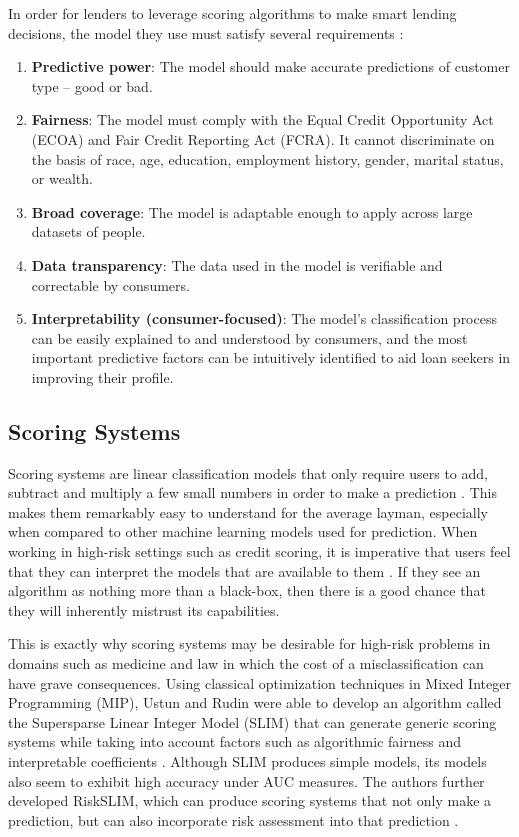 \documentclass[11pt, margin=1in]{article}
\begin{document}
In order for lenders to leverage scoring algorithms to make smart lending decisions, the model they use must satisfy several requirements \cite{fico-criteria}:
\begin{enumerate}
	\item \textbf{Predictive power}: The model should make accurate predictions of customer type -- good or bad.
	\item \textbf{Fairness}: The model must comply with the Equal Credit Opportunity Act (ECOA) and Fair Credit Reporting Act (FCRA). It cannot discriminate on the basis of race, age, education, employment history, gender, marital status, or wealth.
	\item \textbf{Broad coverage}: The model is adaptable enough to apply across large datasets of people.
	\item \textbf{Data transparency}: The data used in the model is verifiable and correctable by consumers.
	\item \textbf{Interpretability (consumer-focused)}: The model's classification process can be easily explained to and understood by consumers, and the most important predictive factors can be intuitively identified to aid loan seekers in improving their profile.
\end{enumerate}

\subsection{Scoring Systems}
Scoring systems are linear classification models that only require users to add, subtract and multiply a few small numbers in order to make a prediction \cite{slim}.  This makes them remarkably easy to understand for the average layman, especially when compared to other machine learning models used for prediction.  When working in high-risk settings such as credit scoring, it is imperative that users feel that they can interpret the models that are available to them \cite{ml-social-problems}.  If they see an algorithm as nothing more than a black-box, then there is a good chance that they will inherently mistrust its capabilities.  

This is exactly why scoring systems may be desirable for high-risk problems in domains such as medicine and law \cite{slim, risk-slim} in which the cost of a misclassification can have grave consequences.  Using classical optimization techniques in Mixed Integer Programming (MIP), Ustun and Rudin were able to develop an algorithm called the Supersparse Linear Integer Model (SLIM) that can generate generic scoring systems while taking into account factors such as algorithmic fairness and interpretable coefficients \cite{slim}.  Although SLIM produces simple models, its models also seem to exhibit high accuracy under AUC measures.  The authors further developed RiskSLIM, which can produce scoring systems that not only make a prediction, but can also incorporate risk assessment into that prediction \cite{risk-slim}.   
\end{document}
